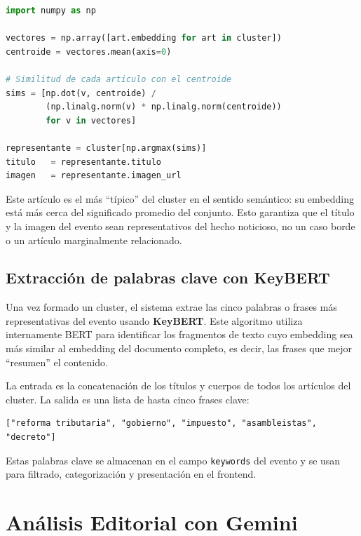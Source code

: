 \documentclass[12pt,a4paper]{article}
\begin{document}
\begin{lstlisting}[language=Python, caption=Selección por centroide en embeddings.py]
import numpy as np

vectores = np.array([art.embedding for art in cluster])
centroide = vectores.mean(axis=0)

# Similitud de cada articulo con el centroide
sims = [np.dot(v, centroide) /
        (np.linalg.norm(v) * np.linalg.norm(centroide))
        for v in vectores]

representante = cluster[np.argmax(sims)]
titulo   = representante.titulo
imagen   = representante.imagen_url
\end{lstlisting}

Este artículo es el más ``típico'' del cluster en el sentido semántico: su embedding está más cerca del significado promedio del conjunto. Esto garantiza que el título y la imagen del evento sean representativos del hecho noticioso, no un caso borde o un artículo marginalmente relacionado.

\subsection{Extracción de palabras clave con KeyBERT}

Una vez formado un cluster, el sistema extrae las cinco palabras o frases más representativas del evento usando \textbf{KeyBERT}. Este algoritmo utiliza internamente BERT para identificar los fragmentos de texto cuyo embedding sea más similar al embedding del documento completo, es decir, las frases que mejor ``resumen'' el contenido.

La entrada es la concatenación de los títulos y cuerpos de todos los artículos del cluster. La salida es una lista de hasta cinco frases clave:

\begin{lstlisting}[caption=Ejemplo de salida de KeyBERT]
["reforma tributaria", "gobierno", "impuesto", "asambleistas", "decreto"]
\end{lstlisting}

Estas palabras clave se almacenan en el campo \texttt{keywords} del evento y se usan para filtrado, categorización y presentación en el frontend.

\section{Análisis Editorial con Gemini}
\end{document}
